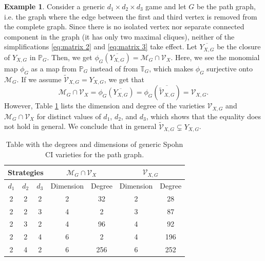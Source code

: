 \documentclass[11pt]{amsart}
\numberwithin{equation}{section}
\theoremstyle{plain}
\numberwithin{theorem}{section}
\theoremstyle{definition}
\newtheorem{example}[theorem]{Example}
\newcommand{\PP}{{\mathbb P}}
\begin{document}
\begin{example}\label{ex: wrong saturaion}
Consider a generic $d_1 \times d_2 \times d_3$ game and let $G$ be the path graph, i.e. the graph where the edge between the first and third vertex is removed from the complete graph. Since there is no isolated vertex nor separate connected component in the graph (it has only two maximal cliques), neither of the simplifications \eqref{eq:matrix 2} and \eqref{eq:matrix 3} take effect. Let $\overline{Y_{X,G}}$ be the closure of $Y_{X,G}$ in $\PP_G$. Then, we get $\phi_G(\overline{Y_{X,G}})=\mathcal M_G\cap\mathcal V_X$. Here, we see the monomial map $\phi_G$ as a map from $\PP_G$ instead of from $\mathbb{T}_G$, which makes $\phi_G$ surjective onto $\mathcal{M}_G$. If we assume $\widetilde{\mathcal{V}}_{X,G}= Y_{X,G}$, we get that 
\[
\mathcal M_G\cap\mathcal V_X=\phi_G\left(\overline{Y_{X,G}}\right)=\phi_G\left(\overline{\widetilde{\mathcal{V}}_{X,G}}\right)=\mathcal V_{X,G}.
\]
 However,
Table \ref{table:2 edge graph} lists the dimension and degree of the varieties $\mathcal V_{X,G}$  and $\mathcal M_G\cap\mathcal V_X$
for distinct values of $d_1$, $d_2$, and $d_3$, which shows that the equality does not hold in general. We conclude that in general $\widetilde{\mathcal{V}}_{X,G}\subsetneq Y_{X,G}$.



\begin{table}
\begin{tabular}{|ccc|cc|cc|}
\hline
\multicolumn{3}{|c|}{Strategies} & \multicolumn{2}{c|}{$\mathcal M_G\cap\mathcal V_X$} & \multicolumn{2}{c|}{$\mathcal V_{X,G}$} \\ \hline
$d_1$ & $d_2$ & $d_3$ & Dimension & Degree & Dimension & Degree \\ \hline
2 & 2 & 2 & 2 & 32 & 2 & 28 \\ \hline
2 & 2 & 3 & 4 & 2 & 3 & 87 \\ \hline
2 & 3 & 2 & 4 & 96 & 4 & 92 \\ \hline
2 & 2 & 4 & 6 & 2 & 4 & 196 \\ \hline
2 & 4 & 2 & 6 & 256 & 6 & 252 \\ \hline
\end{tabular}
\caption{Table with the degrees and dimensions of generic Spohn CI varieties for the path graph.}
\label{table:2 edge graph}
\end{table}
\end{example}
\end{document}

